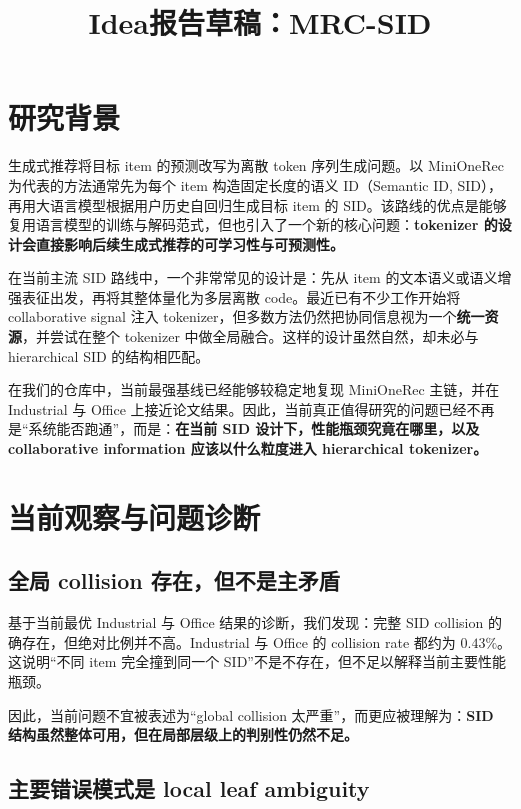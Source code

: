 \documentclass[11pt]{article}
\title{Idea报告草稿：MRC-SID}
\author{}
\date{}
\makeatletter
\renewcommand{\maketitle}{%
  \begin{center}
    {\LARGE \@title\par}
  \end{center}
  \vspace{-0.6\baselineskip}
}
\makeatother
\begin{document}
\maketitle

\section{研究背景}

生成式推荐将目标 item 的预测改写为离散 token 序列生成问题。以 MiniOneRec 为代表的方法通常先为每个 item 构造固定长度的语义 ID（Semantic ID, SID），再用大语言模型根据用户历史自回归生成目标 item 的 SID。该路线的优点是能够复用语言模型的训练与解码范式，但也引入了一个新的核心问题：\textbf{tokenizer 的设计会直接影响后续生成式推荐的可学习性与可预测性。}

在当前主流 SID 路线中，一个非常常见的设计是：先从 item 的文本语义或语义增强表征出发，再将其整体量化为多层离散 code。最近已有不少工作开始将 collaborative signal 注入 tokenizer，但多数方法仍然把协同信息视为一个\textbf{统一资源}，并尝试在整个 tokenizer 中做全局融合。这样的设计虽然自然，却未必与 hierarchical SID 的结构相匹配。

在我们的仓库中，当前最强基线已经能够较稳定地复现 MiniOneRec 主链，并在 Industrial 与 Office 上接近论文结果。因此，当前真正值得研究的问题已经不再是“系统能否跑通”，而是：\textbf{在当前 SID 设计下，性能瓶颈究竟在哪里，以及 collaborative information 应该以什么粒度进入 hierarchical tokenizer。}

\section{当前观察与问题诊断}

\subsection{全局 collision 存在，但不是主矛盾}

基于当前最优 Industrial 与 Office 结果的诊断，我们发现：完整 SID collision 的确存在，但绝对比例并不高。Industrial 与 Office 的 collision rate 都约为 $0.43\%$。这说明“不同 item 完全撞到同一个 SID”不是不存在，但不足以解释当前主要性能瓶颈。

因此，当前问题不宜被表述为“global collision 太严重”，而更应被理解为：\textbf{SID 结构虽然整体可用，但在局部层级上的判别性仍然不足。}

\subsection{主要错误模式是 local leaf ambiguity}
\end{document}
